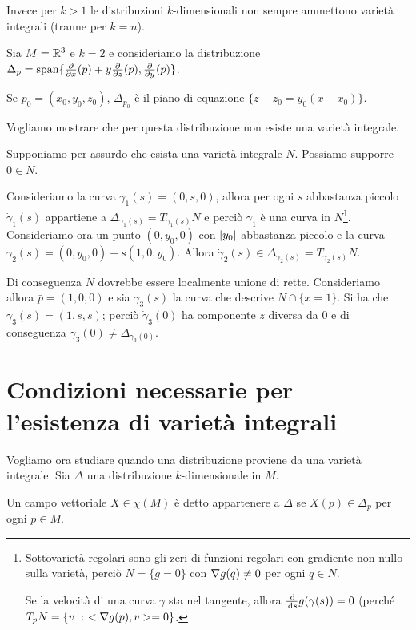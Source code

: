 Invece per $k>1$ le distribuzioni $k$-dimensionali non sempre ammettono varietà integrali (tranne per $k=n$).

\begin{example}
	Sia $M=\mathbb R^3$ e $k=2$ e consideriamo la distribuzione $\Delta_p=\mathrm{span}\{\frac{\partial }{\partial x}(p)+y\frac{\partial }{\partial z}(p),\frac{\partial }{\partial y}(p)\}$.
	
	Se $p_0=(x_0,y_0,z_0)$, $\Delta_{p_0}$ è il piano di equazione $\{z-z_0=y_0(x-x_0)\}$.
	
	Vogliamo mostrare che per questa distribuzione non esiste una varietà integrale.
	
	Supponiamo per assurdo che esista una varietà integrale $N$. Possiamo supporre $0\in N$.
	
	Consideriamo la curva $\gamma_1(s)=(0,s,0)$, allora per ogni $s$ abbastanza piccolo $\dot\gamma_1(s)$ appartiene a $\Delta_{\gamma_1(s)}=T_{\gamma_1(s)}N$ e perciò $\gamma_1$ è una curva in $N$\footnote{Sottovarietà regolari sono gli zeri di funzioni regolari con gradiente non nullo sulla varietà, perciò $N=\{g=0\}$ con $\nabla g(q)\ne 0$ per ogni $q\in N$.
	
	Se la velocità di una curva $\gamma$ sta nel tangente, allora $\frac{\,\mathrm d}{\,\mathrm d s}g(\gamma(s))=0$ (perché $T_pN=\{v\ : \ <\nabla g(p),v>=0\}$.}.
	Consideriamo ora un punto $(0,y_0,0)$ con $\lvert y_0\rvert$ abbastanza piccolo e la curva $\gamma_2(s)=(0,y_0,0)+s(1,0,y_0)$. Allora $\dot\gamma_2(s)\in\Delta_{\gamma_2(s)}=T_{\gamma_2(s)}N$.
	
	Di conseguenza $N$ dovrebbe essere localmente unione di rette. Consideriamo allora $\bar p=(1,0,0)$ e sia $\gamma_3(s)$ la curva che descrive $N\cap\{x=1\}$.
	Si ha che $\gamma_3(s)=(1,s,s)$; perciò $\dot\gamma_3(0)$ ha componente $z$ diversa da 0 e di conseguenza $\gamma_3(0)\ne \Delta_{\gamma_3(0)}$.
\end{example}

\section{Condizioni necessarie per l'esistenza di varietà integrali}

Vogliamo ora studiare quando una distribuzione proviene da una varietà integrale.
Sia $\Delta$ una distribuzione $k$-dimensionale in $M$.

\begin{definition}
	Un campo vettoriale $X\in\chi(M)$ è detto appartenere a $\Delta$ se $X(p)\in\Delta_p$ per ogni $p\in M$.
\end{definition}


